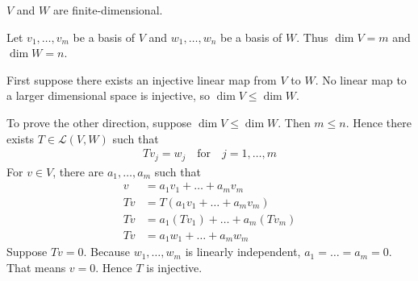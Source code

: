 \documentclass[a5paper]{article}
\begin{document}
\newcommand    \C          {\mathbf{C}}
\newcommand    \R          {\mathbf{R}}
\renewcommand  \L          {\mathcal{L}}
\newcommand    \F          {\mathbf{F}}
\renewcommand  \P          {\mathcal{P}}
\newcommand    \nullspace  {\text{null\;}}
\newcommand    \range      {\text{range\;}}
\newcommand    \linspan    {\text{span\;}}

    $V$ and $W$ are finite-dimensional.

    Let $v_1,\dots,v_m$ be a basis of $V$ and $w_1,\dots,w_n$ be a basis of $W$.
    Thus $\dim V = m$ and $\dim W = n$.

    First suppose there exists an injective linear map from $V$ to $W$.
    No linear map to a larger dimensional space is injective, so $\dim V \le \dim W$.

    To prove the other direction, suppose $\dim V \le \dim W$.
    Then $m \le n$.
    Hence there exists $T \in \L(V,W)$ such that
\begin{align*}
        Tv_j = w_j \quad \text{for} \quad j = 1, \dots, m
\end{align*}
    For $v \in V$, there are $a_1,\dots,a_m$ such that
\begin{align*}
         v &=   a_1v_1 + \dots + a_mv_m             \\
        Tv &= T(a_1v_1 + \dots + a_mv_m)            \\
        Tv &= a_1(Tv_1) + \dots + a_m(Tv_m)         \\
        Tv &= a_1w_1 + \dots + a_mw_m
\end{align*}
    Suppose $Tv = 0$.
    Because $w_1,\dots,w_m$ is linearly independent, $a_1=\dots=a_m=0$.
    That means $v=0$.
    Hence $T$ is injective.
\end{document}
